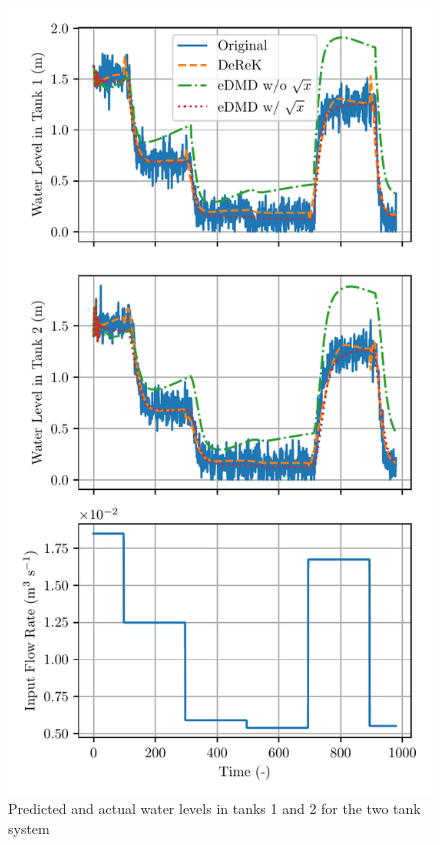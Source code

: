 \documentclass[conference]{IEEEtran}
\begin{document}
\begin{figure}[htbp]\label{fig:two_tanks_results}
    \centerline{\includegraphics[width=\linewidth]{figures/dmdc_multipred-p0-q0-hm20-hl0.pdf}}
    \caption{Predicted and actual water levels in tanks 1 and 2 for the two tank system}
\end{figure}
\end{document}
